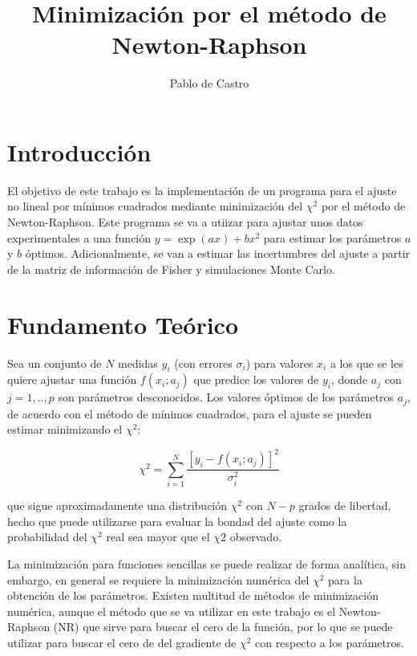 \documentclass{article}
\title{Minimización por el método de Newton-Raphson}
\author{Pablo de Castro}
\begin{document}
    
    
    \maketitle
    
    

    

    \section{Introducción}


    El objetivo de este trabajo es la implementación de un programa para el
ajuste no lineal por mínimos cuadrados mediante minimización del
\(\chi^2\) por el método de Newton-Raphson. Este programa se va a
utiizar para ajustar unos datos experimentales a una función
\(y=\exp(ax)+bx^2\) para estimar los parámetros \(a\) y \(b\) óptimos.
Adicionalmente, se van a estimar las incertumbres del ajuste a partir de
la matriz de información de Fisher y simulaciones Monte Carlo.


    \section{Fundamento Teórico}


    Sea un conjunto de \(N\) medidas \(y_i\) (con errores \(\sigma_i\)) para
valores \(x_i\) a los que se les quiere ajustar una función
\(f(x_i;a_j)\) que predice los valores de \(y_i\), donde \(a_j\) con
\(j=1,..,p\) son parámetros desconocidos. Los valores óptimos de los
parámetros \(a_j\), de acuerdo con el método de mínimos cuadrados, para
el ajuste se pueden estimar minimizando el \(\chi^2\):

\[\chi^2 = \sum_{i=1}^{N} \frac{[y_i -f(x_i;a_j)]^2}{\sigma_i^2} \]

que sigue aproximadamente una distribución \(\chi^2\) con \(N-p\) grados
de libertad, hecho que puede utilizarse para evaluar la bondad del
ajuste como la probabilidad del \(\chi^2\) real sea mayor que el
\(\chi2\) observado.

La minimización para funciones sencillas se puede realizar de forma
analítica, sin embargo, en general se requiere la minimización numérica
del \(\chi^2\) para la obtención de los parámetros. Existen multitud de
métodos de minimización numérica, aunque el método que se va utilizar en
este trabajo es el Newton-Raphson (NR) que sirve para buscar el cero de
la función, por lo que se puede utilizar para buscar el cero de del
gradiente de \(\chi^2\) con respecto a los parámetros.
\end{document}

